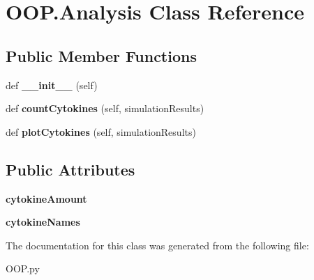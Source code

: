 \hypertarget{class_o_o_p_1_1_analysis}{}\section{O\+O\+P.\+Analysis Class Reference}
\label{class_o_o_p_1_1_analysis}
\subsection*{Public Member Functions}
\begin{DoxyCompactItemize}
\item 
\mbox{\label{class_o_o_p_1_1_analysis_ab4b7c43065313c288381613d4f8aef98}} 
def {\bfseries \+\_\+\+\_\+init\+\_\+\+\_\+} (self)
\item 
\mbox{\label{class_o_o_p_1_1_analysis_ac546b71a8d77db12fdc51bc082663e05}} 
def {\bfseries count\+Cytokines} (self, simulation\+Results)
\item 
\mbox{\label{class_o_o_p_1_1_analysis_af92b055dfa67cb7e686755f7c41674df}} 
def {\bfseries plot\+Cytokines} (self, simulation\+Results)
\end{DoxyCompactItemize}
\subsection*{Public Attributes}
\begin{DoxyCompactItemize}
\item 
\mbox{\label{class_o_o_p_1_1_analysis_a6081436f5f7f9cffc37e7363baee1f4d}} 
{\bfseries cytokine\+Amount}
\item 
\mbox{\label{class_o_o_p_1_1_analysis_aeaa2243b8bbc7c25dfd075fee3df26af}} 
{\bfseries cytokine\+Names}
\end{DoxyCompactItemize}


The documentation for this class was generated from the following file\+:\begin{DoxyCompactItemize}
\item 
O\+O\+P.\+py\end{DoxyCompactItemize}
